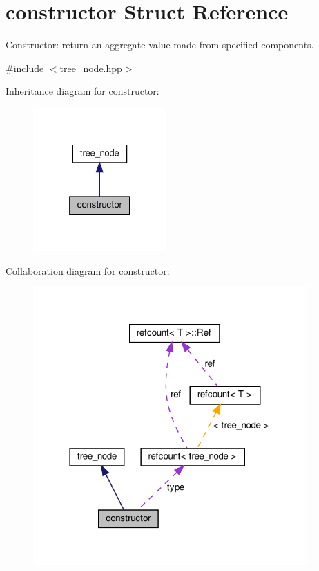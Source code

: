\hypertarget{structconstructor}{}\section{constructor Struct Reference}
\label{structconstructor}


Constructor\+: return an aggregate value made from specified components.  




{\ttfamily \#include $<$tree\+\_\+node.\+hpp$>$}



Inheritance diagram for constructor\+:
\nopagebreak
\begin{figure}[H]
\begin{center}
\leavevmode
\includegraphics[width=145pt]{d8/def/structconstructor__inherit__graph}
\end{center}
\end{figure}


Collaboration diagram for constructor\+:
\nopagebreak
\begin{figure}[H]
\begin{center}
\leavevmode
\includegraphics[width=297pt]{d0/d3f/structconstructor__coll__graph}
\end{center}
\end{figure}
